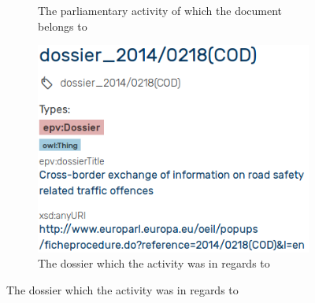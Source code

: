 \documentclass{article}
\begin{document}
\begin{figure}
\begin{subfigure}{.33\textwidth}
  \caption{The parliamentary activity of which the document belongs to}
  \label{fig:propertiesActivity}
\end{subfigure}
\begin{subfigure}{.33\textwidth}
  \centering
  \includegraphics[width=\linewidth]{images/dossier.png}
  \caption{The dossier which the activity was in regards to}
  \label{fig:propertiesDossier}
\end{subfigure}
\label{fig:propertiesDocDossier}
\end{figure}

\FloatBarrier


\end{document}
